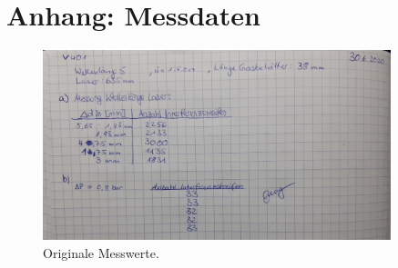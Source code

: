 \newpage
\section*{Anhang: Messdaten}

\begin{figure}
    \centering
    \includegraphics[width=0.9\textwidth]{plots/Interf_anhang.jpg}
    \caption{Originale Messwerte.}
\end{figure}